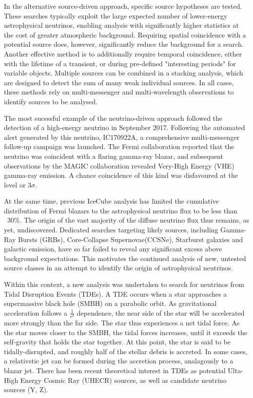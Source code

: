 \documentclass[]{article}
\begin{document}
	In the alternative source-driven approach, specific source hypotheses are tested. These searches typically exploit the large expected number of lower-energy astrophysical neutrinos, enabling analysis with significantly higher statistics at the cost of greater atmospheric background. Requiring spatial coincidence with a potential source does, however, significantly reduce the background for a search. Another effective method is to additionally require temporal coincidence, either with the lifetime of a transient, or during  pre-defined "interesting periods" for variable objects. Multiple sources can be combined in a stacking analysis, which are designed to detect the sum of many weak individual sources. In all cases, these methods rely on multi-messenger and multi-wavelength observations to identify sources to be analysed.
	
	The most sucessful example of the neutrino-driven approach followed the detection of a high-energy neutrino in September 2017. Following the automated alert generated by this neutrino,  IC170922A, a comprehensive multi-messenger follow-up campaign was launched. The Fermi collaboration reported that the neutrino was coincident with a flaring gamma-ray blazar, and subsequent observations by the MAGIC collaboration revealed Very-High Energy (VHE) gamma-ray emission. A chance coincidence of this kind was disfavoured at the level or 3$\sigma$.
	
	At the same time, previous IceCube analysis has limited the cumulative distribution of Fermi blazars to the astrophysical neutrino flux to be less than ~30\%. The origin of the vast majority of the diffuse neutrino flux thus remains, as yet, undiscovered. Dedicated searches targeting likely sources, including Gamma-Ray Bursts (GRBs), Core-Collapse Supernovae(CCSNe), Starburst galaxies and galactic emission, have so far failed to reveal any significant excess above background expectations. This motivates the continued analysis of new, untested source classes in an attempt to identify the origin of astrophysical neutrinos.
	
	Within this context, a new analysis was undertaken to search for neutrinos from Tidal Disruption Events (TDEs). A TDE occurs when a star approaches a supermassive black hole (SMBH) on a parabolic orbit. As gravitational acceleration follows a $\frac{1}{r^{2}}$ dependence, the near side of the star will be accelerated more strongly than the far side. The star thus experiences a net tidal force. As the star moves closer to the SMBH, the tidal forces increases, until it exceeds the self-gravity that holds the star together. At this point, the star is said to be tidally-disrupted, and roughly half of the stellar debris is accreted. In some cases, a relativstic jet can be formed during the accretion process, analagously to a blazar jet. There has been recent theoretical interest in TDEs as potential Ulta-High Energy Cosmic Ray (UHECR) sources, as well as candidate neutrino sources (Y, Z).
	 
\end{document}
